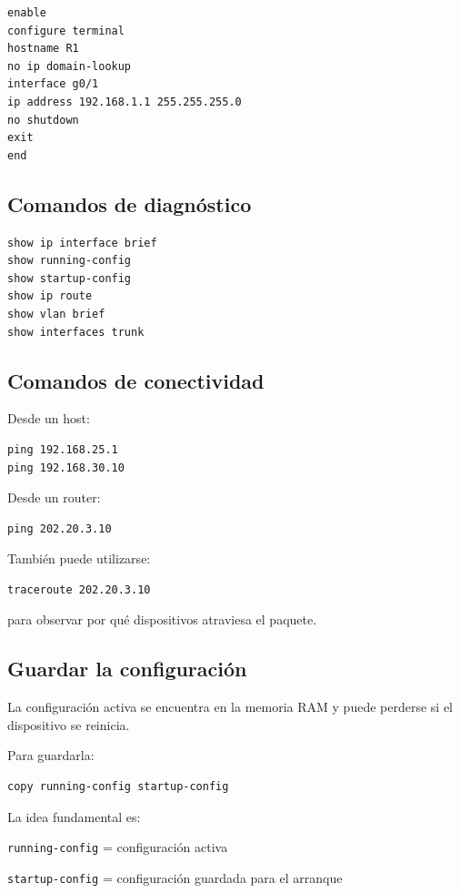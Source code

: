 \documentclass[12pt]{article}
\begin{document}
\begin{lstlisting}
enable
configure terminal
hostname R1
no ip domain-lookup
interface g0/1
ip address 192.168.1.1 255.255.255.0
no shutdown
exit
end
\end{lstlisting}


\subsection{Comandos de diagnóstico}

\begin{lstlisting}
show ip interface brief
show running-config
show startup-config
show ip route
show vlan brief
show interfaces trunk
\end{lstlisting}


\subsection{Comandos de conectividad}

Desde un host:

\begin{lstlisting}
ping 192.168.25.1
ping 192.168.30.10
\end{lstlisting}

Desde un router:

\begin{lstlisting}
ping 202.20.3.10
\end{lstlisting}

También puede utilizarse:

\begin{lstlisting}
traceroute 202.20.3.10
\end{lstlisting}

para observar por qué dispositivos atraviesa el paquete.


\subsection{Guardar la configuración}

La configuración activa se encuentra en la memoria RAM y puede perderse
si el dispositivo se reinicia.

Para guardarla:

\begin{lstlisting}
copy running-config startup-config
\end{lstlisting}

La idea fundamental es:

\begin{center}
\texttt{running-config} = configuración activa

\texttt{startup-config} = configuración guardada para el arranque
\end{center}
\end{document}
